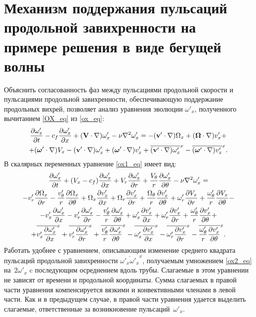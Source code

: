 \section{Механизм поддержания пульсаций продольной завихренности на примере решения в виде бегущей волны} \label{ox1gen_seq}

Объяснить согласованность фаз между пульсациями продольной скорости и пульсациями продольной завихренности, обеспечивающую поддержание продольных вихрей, позволяет анализ уравнения эволюции $\omega'_x$, полученного вычитанием \eqref{OX_eq} из \eqref{ox_eq}:
\begin{multline}\label{ox1_eq}
\frac{\partial \omega'_x}{\partial t} - c_f\frac{\partial \omega'_x}{\partial x} + (\mathbf{V} \cdot \nabla) \omega'_x - \nu \nabla^2 \omega'_x = - (\mathbf{v}' \cdot \nabla) \Omega_x
+(\mbox{\boldmath$\Omega$} \cdot \nabla) v'_x + \\ + (\mbox{\boldmath$\omega$}' \cdot \nabla) V_x - (\mathbf{v}' \cdot \nabla) \omega'_x  + (\mbox{\boldmath$\omega$}' \cdot \nabla) v'_x  + \overline{(\mathbf{v}' \cdot \nabla) \omega'_x}^x  - \overline{(\mbox{\boldmath$\omega$}' \cdot \nabla)v'_x}^x.
\end{multline}
В скалярных переменных уравнение \eqref{ox1_eq} имеет вид:
\begin{multline}\label{ox2_eq}
\frac{\partial \omega'_x}{\partial t} + (V_x - c_f)\frac{\partial \omega'_x}{\partial x} + V_r \frac{\partial \omega_x'}{\partial r} + \frac{V_\theta}{r} \frac{\partial \omega'_x}{\partial \theta} 
- \nu\nabla^2\omega'_x = \\
- v'_r \frac{\partial \Omega_x}{\partial r} - \frac{v'_\theta}{r} \frac{\partial \Omega_x}{\partial \theta} 
+ \Omega_x \frac{\partial v'_x}{\partial x} + \Omega_r \frac{\partial v'_x}{\partial r} + \frac{\Omega_\theta}{r} \frac{\partial v'_x}{\partial \theta}
+ \omega'_r \frac{\partial V_x}{\partial r} + \frac{\omega'_\theta}{r} \frac{\partial V_x}{\partial \theta} - \\ 
- v'_x \frac{\partial \omega'_x}{\partial x} - v'_r \frac{\partial \omega'_x}{\partial r} - \frac{v'_\theta}{r} \frac{\partial \omega'_x}{\partial \theta} 
+ \omega'_x \frac{\partial v'_x}{\partial x} + \omega'_r \frac{\partial v'_x}{\partial r} + \frac{\omega'_\theta}{r} \frac{\partial v'_x}{\partial \theta} + \\
+ \overline{v'_x \frac{\partial \omega'_x}{\partial x}}^x + \overline{v'_r \frac{\partial \omega'_x}{\partial r}}^x + \overline{\frac{v'_\theta}{r} \frac{\partial \omega'_x}{\partial \theta}}^x
- \overline{\omega'_x \frac{\partial v'_x}{\partial x}}^x - \overline{\omega'_r \frac{\partial v'_x}{\partial r}}^x - \overline{\frac{\omega'_\theta}{r} \frac{\partial v'_x}{\partial \theta}}^x.
\end{multline}
Работать удобнее с уравнением, описывающим изменение среднего квадрата пульсаций продольной завихренности $\overline{\omega'_x\omega'_x}^x$, получаемым умножением \eqref{ox2_eq} на~$2\omega'_x$ c последующим осреднением вдоль трубы. Слагаемые в этом уравнении не зависят от времени и продольной координаты. Сумма слагаемых в правой части уравнения компенсируется вязкими и конвективными членами в левой части. Как и в предыдущем случае, в правой части уравнения удается выделить слагаемые, ответственные за возникновение пульсаций~$\omega'_x$. 


